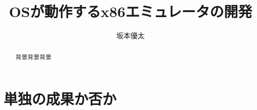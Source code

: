 \documentclass[10pt,a4j]{jsarticle}
\title{\vspace{-4cm}OSが動作するx86エミュレータの開発}
\author{坂本優太}
\date{}
\begin{document}
\maketitle

\renewcommand{\abstractname}{背景}
\begin{abstract}
	背景背景背景
\end{abstract}

\section{単独の成果か否か}
\end{document}
